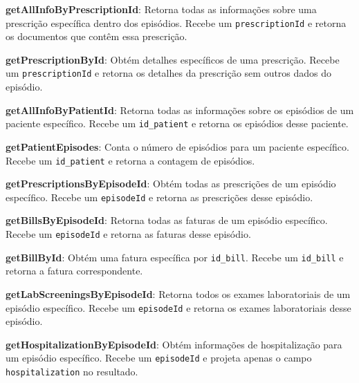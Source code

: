 \vspace{0.15cm}

\textbf{getAllInfoByPrescriptionId}: Retorna todas as informações sobre uma prescrição específica dentro dos episódios. Recebe um \texttt{prescriptionId} e retorna os documentos que contêm essa prescrição.

\vspace{0.15cm}

\textbf{getPrescriptionById}: Obtém detalhes específicos de uma prescrição. Recebe um \texttt{prescriptionId} e retorna os detalhes da prescrição sem outros dados do episódio.

\vspace{0.15cm}

\textbf{getAllInfoByPatientId}: Retorna todas as informações sobre os episódios de um paciente específico. Recebe um \texttt{id\_patient} e retorna os episódios desse paciente.

\vspace{0.15cm}

\textbf{getPatientEpisodes}: Conta o número de episódios para um paciente específico. Recebe um \texttt{id\_patient} e retorna a contagem de episódios.

\vspace{0.15cm}

\textbf{getPrescriptionsByEpisodeId}: Obtém todas as prescrições de um episódio específico. Recebe um \texttt{episodeId} e retorna as prescrições desse episódio.

\vspace{0.15cm}

\textbf{getBillsByEpisodeId}: Retorna todas as faturas de um episódio específico. Recebe um \texttt{episodeId} e retorna as faturas desse episódio.

\vspace{0.15cm}

\textbf{getBillById}: Obtém uma fatura específica por \texttt{id\_bill}. Recebe um \texttt{id\_bill} e retorna a fatura correspondente.

\vspace{0.15cm}

\textbf{getLabScreeningsByEpisodeId}: Retorna todos os exames laboratoriais de um episódio específico. Recebe um \texttt{episodeId} e retorna os exames laboratoriais desse episódio.

\vspace{0.15cm}

\textbf{getHospitalizationByEpisodeId}: Obtém informações de hospitalização para um episódio específico. Recebe um \texttt{episodeId} e projeta apenas o campo \texttt{hospitalization} no resultado.

